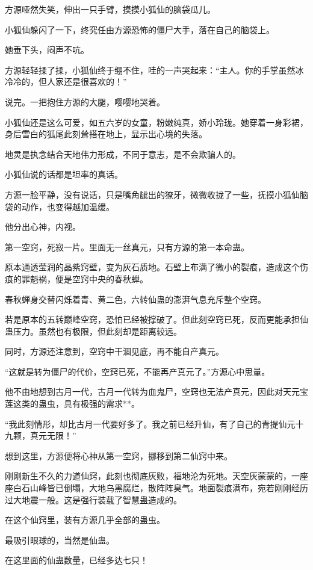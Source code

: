 \begin{this_body}
方源哑然失笑，伸出一只手臂，摸摸小狐仙的脑袋瓜儿。

小狐仙躲闪了一下，终究任由方源恐怖的僵尸大手，落在自己的脑袋上。

她垂下头，闷声不吭。

方源轻轻揉了揉，小狐仙终于绷不住，哇的一声哭起来：“主人。你的手掌虽然冰冷冷的，但人家还是很喜欢的！”

说完。一把抱住方源的大腿，嘤嘤地哭着。

小狐仙还是这么可爱，如五六岁的女童，粉嫩纯真，娇小玲珑。她穿着一身彩裙，身后雪白的狐尾此刻耸搭在地上，显示出心境的失落。

地灵是执念结合天地伟力形成，不同于意志，是不会欺骗人的。

小狐仙说的话都是坦率的真话。

方源一脸平静，没有说话，只是嘴角龇出的獠牙，微微收拢了一些，抚摸小狐仙脑袋的动作，也变得越加温缓。

他分出心神，内视。

第一空窍，死寂一片。里面无一丝真元，只有方源的第一本命蛊。

原本通透莹润的晶紫窍壁，变为灰石质地。石壁上布满了微小的裂痕，造成这个伤痕的罪魁祸，便是空窍中央的春秋蝉。

春秋蝉身交替闪烁着青、黄二色，六转仙蛊的澎湃气息充斥整个空窍。

若是原本的五转巅峰空窍，恐怕已经被撑破了。但此刻空窍已死，反而更能承担仙蛊压力。虽然也有极限，但此刻却是距离较远。

同时，方源还注意到，空窍中干涸见底，再不能自产真元。

“这就是转为僵尸的代价，空窍已死，不能再产真元了。”方源心中思量。

他不由地想到古月一代，古月一代转为血鬼尸，空窍也无法产真元，因此对天元宝莲这类的蛊虫，具有极强的需求**。

“我此刻情形，却比古月一代要好多了。我之前已经升仙，有了自己的青提仙元十九颗，真元无限！”

想到这里，方源便将心神从第一空窍，挪移到第二仙窍中来。

刚刚新生不久的力道仙窍，此刻也彻底灰败，福地沦为死地。天空灰蒙蒙的，一座座白石山峰皆已倒塌，大地乌黑腐烂，散阵阵臭气。地面裂痕满布，宛若刚刚经历过大地震一般。这是强行装载了智慧蛊造成的。

在这个仙窍里，装有方源几乎全部的蛊虫。

最吸引眼球的，当然是仙蛊。

在这里面的仙蛊数量，已经多达七只！


\end{this_body}
